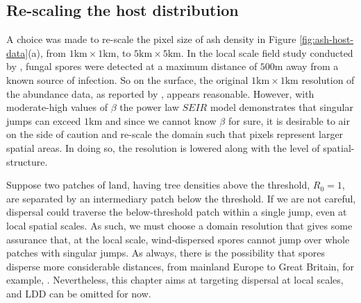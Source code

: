 \subsection{Re-scaling the host distribution}
\label{ch6:re-scaling-host-data}
A choice was made to re-scale the pixel size of ash density in Figure \ref{fig:ash-host-data}(a), from $1\mathrm{km} \times 1 \mathrm{km}$, to $5\mathrm{km} \times 5 \mathrm{km}$. In the local scale field study conducted by \cite{grosdidier2018tracking}, fungal spores were detected at a maximum distance of $500\mathrm{m}$ away from a known source of infection. So on the surface, the original $1\mathrm{km} \times 1 \mathrm{km}$ resolution of the abundance data, as reported by \cite{hill.data}, appears reasonable. However, with moderate-high values of $\beta$ the power law $SEIR$ model demonstrates that singular jumps can exceed $1\mathrm{km}$ and since we cannot know $\beta$ for sure, it is desirable to air on the side of caution and re-scale the domain such that pixels represent larger spatial areas. In doing so, the resolution is lowered along with the level of spatial-structure. 

Suppose two patches of land, having tree densities above the threshold, $R_0 = 1$, are separated by an intermediary patch below the threshold. If we are not careful, dispersal could traverse the below-threshold patch within a single jump, even at local spatial scales. As such, we must choose a domain resolution that gives some assurance that, at the local scale, wind-dispersed spores cannot jump over whole patches with singular jumps. As always, there is the possibility that spores disperse more considerable distances, from mainland Europe to Great Britain, for example, \cite{freer2017tree, wylder2018evidence}. Nevertheless, this chapter aims at targeting dispersal at local scales, and LDD can be omitted for now.


